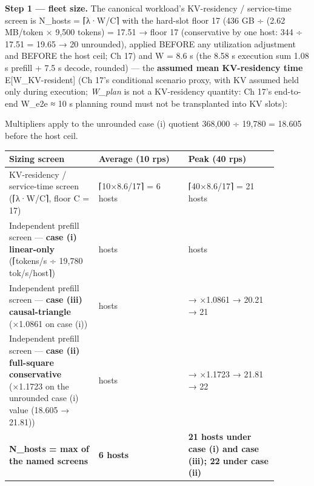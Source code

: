 \textbf{Step 1 --- fleet size.} The canonical workload's KV-residency /
service-time screen is N\_hosts = ⌈λ·W/C⌉ with the hard-slot floor 17
(436 GB ÷ (2.62 MB/token × 9,500 tokens) = 17.51 → floor 17
(conservative by one host: 344 ÷ 17.51 = 19.65 → 20 unrounded), applied
BEFORE any utilization adjustment and BEFORE the host ceil; Ch 17) and W
= 8.6 s (the 8.58 s execution sum 1.08 s prefill + 7.5 s decode,
rounded) --- the \textbf{assumed mean KV-residency time}
E{[}W\_KV-resident{]} (Ch 17's conditional scenario proxy, with KV
assumed held only during execution; \emph{W\_plan} is not a KV-residency
quantity: Ch 17's end-to-end W\_e2e ≈ 10 s planning round must not be
transplanted into KV slots):

Multipliers apply to the unrounded case (i) quotient 368,000 ÷ 19,780 =
18.605 before the host ceil.

\nopagebreak[4]
\begin{longtable}[]{@{}
  >{\raggedright\arraybackslash}p{0.2927\linewidth}
  >{\raggedright\arraybackslash}p{0.2927\linewidth}
  >{\raggedright\arraybackslash}p{0.2927\linewidth}@{}}
\toprule\noalign{}
\begin{minipage}[b]{\linewidth}\raggedright
Sizing screen
\end{minipage} & \begin{minipage}[b]{\linewidth}\raggedright
Average (10 rps)
\end{minipage} & \begin{minipage}[b]{\linewidth}\raggedright
Peak (40 rps)
\end{minipage} \\
\midrule\noalign{}
\endhead
\bottomrule\noalign{}
\endlastfoot
KV-residency / service-time screen (⌈λ·W/C⌉, floor C = 17) & ⌈10×8.6/17⌉
= 6 hosts & ⌈40×8.6/17⌉ = 21 hosts \\
\noalign{\label{tab:16.3}}
Independent prefill screen --- \textbf{case (i) linear-only} (⌈tokens/s
÷ 19,780 tok/s/host⌉) & 5 hosts & 19 hosts \\
Independent prefill screen --- \textbf{case (iii) causal-triangle}
(×1.0861 on case (i)) & 6 hosts & 18.605 → ×1.0861 → 20.21 → 21 \\
Independent prefill screen --- \textbf{case (ii) full-square
conservative} (×1.1723 on the unrounded case (i) value (18.605 → 21.81))
& 6 hosts & 18.605 → ×1.1723 → 21.81 → 22 \\
\textbf{N\_hosts = max of the named screens} & \textbf{6 hosts} &
\textbf{21 hosts under case (i) and case (iii); 22 under case (ii)} \\
\end{longtable}

